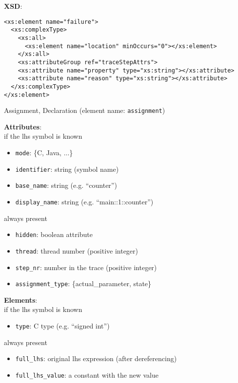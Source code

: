 \documentclass[12pt]{article}
\begin{document}
\noindent\textbf{XSD}:
\begin{verbatim}
<xs:element name="failure">
  <xs:complexType>
    <xs:all>
      <xs:element name="location" minOccurs="0"></xs:element>
    </xs:all>
    <xs:attributeGroup ref="traceStepAttrs">
    <xs:attribute name="property" type="xs:string"></xs:attribute>
    <xs:attribute name="reason" type="xs:string"></xs:attribute>
  </xs:complexType>
</xs:element>
\end{verbatim}
  
\hrulefill

\begin{center}
{\Large Assignment, Declaration} (element name: \texttt{assignment})
\end{center}

\noindent\textbf{Attributes}:\\
if the lhs symbol is known
\begin{itemize}
\item \texttt{mode}: \{C, Java, $\ldots$\}
\item \texttt{identifier}: string (symbol name)
\item \texttt{base\_name}: string (e.g. ``counter'')
\item \texttt{display\_name}: string (e.g. ``main::1::counter'')
\end{itemize}
always present
\begin{itemize}
\item \texttt{hidden}: boolean attribute
\item \texttt{thread}: thread number (positive integer)
\item \texttt{step\_nr}: number in the trace (positive integer)
\item \texttt{assignment\_type}: \{actual\_parameter, state\}
\end{itemize}

\noindent\textbf{Elements}:\\
if the lhs symbol is known
\begin{itemize}
\item \texttt{type}: C type (e.g. ``signed int'')
\end{itemize}
always present
\begin{itemize}
\item \texttt{full\_lhs}: original lhs expression (after dereferencing)
\item \texttt{full\_lhs\_value}: a constant with the new value
\end{itemize}
\end{document}
